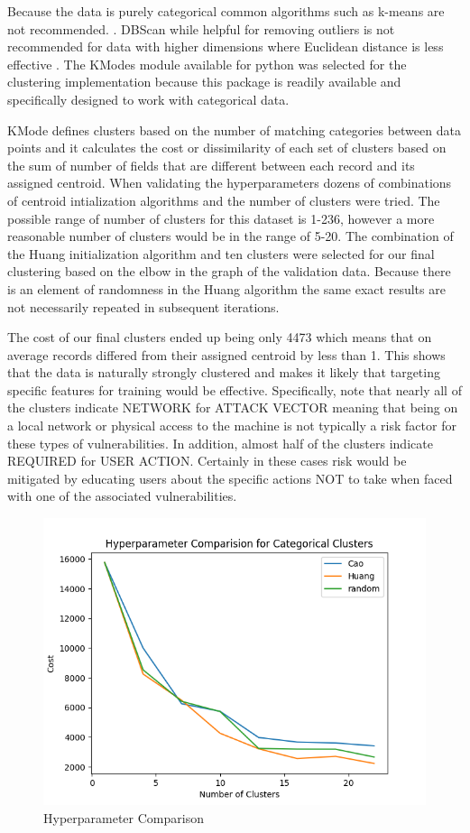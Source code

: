 \documentclass{article} %
\begin{document}
Because the data is purely categorical common algorithms such as k-means are not recommended. \cite{}.  DBScan while helpful for removing outliers is not recommended for data with higher dimensions where Euclidean distance is less effective \cite{}.  The KModes module available for python was selected for the clustering implementation \cite{https://pypi.org/project/kmodes/}  because this package is readily available and specifically designed to work with categorical data.

KMode defines clusters based on the number of matching categories between data points and it calculates the cost or dissimilarity of each set of clusters based on the sum of number of fields that are different between each record and its assigned centroid.  When validating the hyperparameters dozens of combinations of centroid intialization algorithms and the number of clusters were tried.  The possible range of number of clusters for this dataset is 1-236, however a more reasonable number of clusters would be in the range of 5-20.  The combination of the Huang initialization algorithm and ten clusters were selected for our final clustering based on the elbow in the graph of the validation data.  Because there is an element of randomness in the Huang algorithm the same exact results are not necessarily repeated in subsequent iterations.

The cost of our final clusters ended up being only 4473 which means that on average records differed from their assigned centroid by less than 1.  This shows that the data is naturally strongly clustered and makes it likely that targeting specific features for training would be effective.  Specifically, note that nearly all of the clusters indicate NETWORK for ATTACK VECTOR meaning that being on a local network or physical access to the machine is not typically a risk factor for these types of vulnerabilities.  In addition, almost half of the clusters indicate REQUIRED for USER ACTION.  Certainly in these cases risk would be mitigated by educating users about the specific actions NOT to take when faced with one of the associated vulnerabilities.

\begin{figure}[h]
  \centering
  \includegraphics[width=12cm]{images/Hyperparameter.png}
  \caption{Hyperparameter Comparison}
  \label{Figure:VulOntology}
\end{figure}
\end{document}
